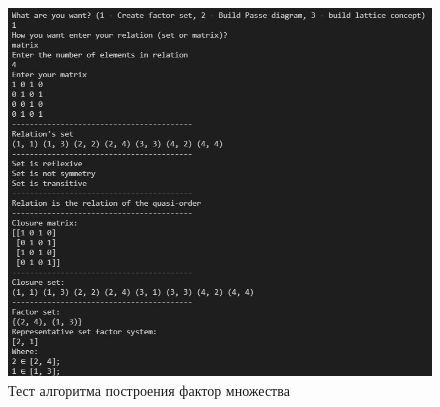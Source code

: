 \documentclass[spec, och, labwork]{shiza}
\begin{document}
        \begin{figure}[H]
            \centering      %
            \includegraphics[width=1.\textwidth]{1}
            \caption{Тест алгоритма построения фактор множества}
            \label{fig:image1}
        \end{figure}
        
\end{document}
